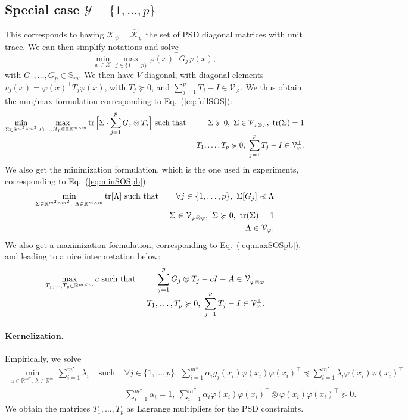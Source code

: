 \documentclass[11pt]{article}
\newcommand{\BEAS}{\begin{eqnarray*}}
\newcommand{\EEAS}{\end{eqnarray*}}
\newcommand{\BEA}{\begin{eqnarray}}
\newcommand{\EEA}{\end{eqnarray}}
\newcommand{\tr}{\mathop{ \rm tr}}
\newcommand{\idm}{I}
\newcommand{\rb}{\mathbb{R}}
\newcommand{\eq}[1]{Eq.~(\ref{eq:#1})}
\def \X{{\mathcal X}}
\def \V{{\mathcal V}}
\def \Y{{\mathcal Y}}
\def \K{{\mathcal K}}
\def \ds{\displaystyle}
\begin{document}
\subsection{Special case $\Y = \{1,\dots,p\}$}
This corresponds to having $\mathcal{K}_\psi = \widehat{\K}_\psi$ the set of PSD diagonal matrices with unit trace. We can then simplify notations and solve
\[
\ds
\min_{x \in \X} \max_{j \in \{1,\dots,p\}} \varphi(x)^\top G_j \varphi(x),
\]
with $G_1,\dots,G_p \in \mathbb{S}_m$.
We then have $V$ diagonal, with diagonal elements $v_j(x) = \varphi(x)^\top T_j \varphi(x)$, with $T_j \succcurlyeq 0$, and $  \sum_{j=1}^ p T_j - \idm \in \V_\varphi^\perp$.
We thus obtain the min/max formulation corresponding to \eq{fullSOS}:
 \BEA
\label{eq:fullfull}\min_{\Sigma \in \rb^{m^2 \times m^2}} \max_{T_1,\dots,T_p \in  \in \rb^{m \times m}}
\tr \Big[ \Sigma \cdot \sum_{j=1}^p G_j \otimes T_j \Big] &  \mbox{ such that} &  \ \Sigma \succcurlyeq 0 , \  \Sigma \in \V_{\varphi \otimes \varphi},  \ \tr(\Sigma) = 1 \\[-.2cm]
\notag & &\  T_1,\dots,T_p \succcurlyeq 0, \  \sum_{j=1}^ p T_j - \idm \in \V_\varphi^\perp.
\EEA
We also get the minimization formulation, which is the one used in experiments, corresponding to \eq{minSOSpb}:
\BEA
\label{eq:minmin} \min_{\Sigma \in \rb^{m^2 \times m^2} , \  \Lambda \in \rb^{m \times m} } \tr [ \Lambda ] 
& \mbox{ such that } &  \forall j \in \{1,\dots,p\}, \ \Sigma [ G_j ] \preccurlyeq \Lambda \\
\notag & &  \Sigma \in \V_{\varphi \otimes \varphi}, \ \Sigma \succcurlyeq 0, \ \tr(\Sigma) = 1 \\
\notag & & \Lambda \in \mathcal{V}_\varphi.
\EEA
We also get a maximization formulation, corresponding to \eq{maxSOSpb}, and leading to a nice interpretation below:
 \BEA
 \label{eq:maxmax}
\max_{T_1,\dots,T_p \in    \rb^{m\times m}}
c  &  \mbox{ such that} &
\sum_{j=1}^p G_j \otimes T_j  - c \idm - A \in  \V_{\varphi \otimes \varphi}^\perp \\[-.2cm]
\notag & &\  T_1,\dots,T_p \succcurlyeq 0, \  \sum_{j=1}^ pT_j - \idm \in \V_\varphi^\perp.
\EEA


\paragraph{Kernelization.} Empirically, we solve
\BEAS
\min_{\alpha \in \rb^{m''} , \ \lambda \in \rb^{m'} } \sum_{i=1}^{m'} \lambda_i
& \mbox{ such that } &  \forall j \in \{1,\dots,p\}, \ \sum_{i=1}^{m''} \alpha_i g_j(x_i) \varphi(x_i) \varphi(x_i)^\top \preccurlyeq \sum_{i=1}^{m'} \lambda_i \varphi(x_i) \varphi(x_i)^\top  \\[-.2cm]
& &   \sum_{i=1}^{m''} \alpha_i = 1, \ \sum_{i=1}^{m''} \alpha_i  \varphi(x_{i})\varphi(x_{i})^\top \otimes 
\varphi(x_{i})\varphi(x_{i})^\top \succcurlyeq 0.
\EEAS
We obtain the matrices $T_1,\dots,T_p$ as Lagrange multipliers for the PSD constraints.
\end{document}
